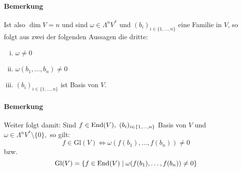 \paragraph{Bemerkung}
	Ist also $ \dim V=n $ und sind $ \omega\in \Lambda^nV^* $ und $ (b_i)_{i\in \{1,\dots,n\}} $ eine Familie in $ V $, so folgt aus zwei der folgenden Aussagen die dritte:
		\begin{enumerate}[(i)]
			\item $ \omega\neq 0 $
			\item $ \omega(b_1,\dots,b_n)\neq 0 $
			\item $ (b_i)_{i\in\{1,\dots,n\}} $ ist Basis von $ V $.
		\end{enumerate}
\paragraph{Bemerkung}
	Weiter folgt damit: Sind $ f\in \End(V),\ (b_i)_{i\in \{1,\dots,n\}} $ Basis von $ V $ und $ \omega\in \Lambda^nV^*\setminus\{0\}, $ so gilt:
		\[ f\in \mathrm{Gl}(V)\Leftrightarrow \omega(f(b_1),\dots,f(b_n))\neq 0 \]
	bzw.
		\[ \mathrm{Gl}(V)=\{f\in \operatorname{End}(V)\mid \omega(f(b_1),\dots,f(b_n))\neq 0\} \]
